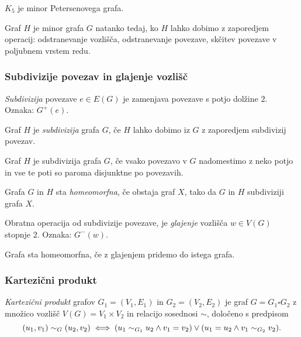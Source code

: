 \begin{primer}
    $K_5$ je minor Petersenovega grafa.
\end{primer}

\begin{opomba}
    Graf $H$ je minor grafa $G$ natanko tedaj, ko $H$ lahko dobimo z zaporedjem operacij: odstranevanje vozlišča, odstranevanje povezave, skčitev povezave v poljubnem vrstem redu.
\end{opomba}

\subsubsection*{Subdivizije povezav in glajenje vozlišč}
\begin{definicija}
    \emph{Subdivizija} povezave $e \in E(G)$ je zamenjava povezave s potjo dolžine $2$. Oznaka: $G^+(e)$.
\end{definicija}
\begin{definicija}
    Graf $H$ je \emph{subdivizija} grafa $G$, če $H$ lahko dobimo iz $G$ z zaporedjem subdivizij povezav.
\end{definicija}
\begin{opomba}
    Graf $H$ je subdivizija grafa $G$, če vsako povezavo v $G$ nadomestimo z neko potjo in vse te poti so paroma disjunktne po povezavih.
\end{opomba}
\begin{definicija}
    Grafa $G$ in $H$ sta \emph{homeomorfna}, če obstaja graf $X$, tako da $G$ in $H$ subdiviziji grafa $X$.
\end{definicija}

\begin{definicija}
    Obratna operacija od subdivizije povezave, je \emph{glajenje} vozlišča $w \in V(G)$ stopnje $2$. Oznaka: $G^-(w)$.
\end{definicija}

\begin{opomba}
    Grafa sta homeomorfna, če z glajenjem pridemo do istega grafa.
\end{opomba}

\subsubsection*{Kartezični produkt}
\begin{definicija}
    \emph{Kartezični produkt} grafov $G_1 = (V_1, E_1)$ in $G_2 = (V_2, E_2)$ je graf $G = G_1 \square G_2$ z množico vozlišč $V(G) = V_1 \times V_2$ in relacijo sosednosi $\sim$, določeno s predpisom
    $$(u_1, v_1) \sim_G (u_2, v_2) \iff (u_1 \sim_{G_1} u_2 \land v_1 = v_2) \lor (u_1 = u_2 \land v_1 \sim_{G_2} v_2).$$
\end{definicija}

